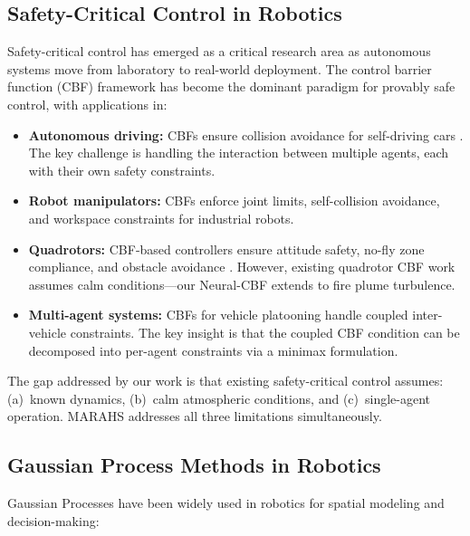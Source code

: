 \documentclass[12pt,a4paper]{article}
\begin{document}
\subsection{Safety-Critical Control in Robotics}

Safety-critical control has emerged as a critical research area as autonomous systems move from laboratory to real-world deployment. The control barrier function (CBF) framework \cite{Ames2014} has become the dominant paradigm for provably safe control, with applications in:

\begin{itemize}[leftmargin=*]
    \item \textbf{Autonomous driving:} CBFs ensure collision avoidance for self-driving cars \cite{Ames2019}. The key challenge is handling the interaction between multiple agents, each with their own safety constraints.
    \item \textbf{Robot manipulators:} CBFs enforce joint limits, self-collision avoidance, and workspace constraints for industrial robots.
    \item \textbf{Quadrotors:} CBF-based controllers ensure attitude safety, no-fly zone compliance, and obstacle avoidance \cite{Glotfelter2017}. However, existing quadrotor CBF work assumes calm conditions---our Neural-CBF extends to fire plume turbulence.
    \item \textbf{Multi-agent systems:} CBFs for vehicle platooning \cite{Wang2018} handle coupled inter-vehicle constraints. The key insight is that the coupled CBF condition can be decomposed into per-agent constraints via a minimax formulation.
\end{itemize}

The gap addressed by our work is that existing safety-critical control assumes: (a)~known dynamics, (b)~calm atmospheric conditions, and (c)~single-agent operation. MARAHS addresses all three limitations simultaneously.

\subsection{Gaussian Process Methods in Robotics}

Gaussian Processes have been widely used in robotics for spatial modeling and decision-making:
\end{document}
